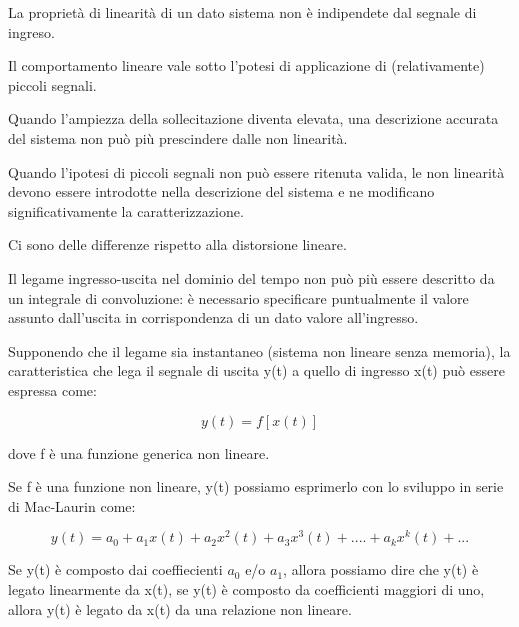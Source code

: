 La proprietà di linearità di un dato sistema non è indipendete dal segnale di ingreso. \newline 

Il comportamento lineare vale sotto l'potesi di applicazione di (relativamente) piccoli segnali. \newline 

Quando l'ampiezza della sollecitazione diventa elevata, 
una descrizione accurata del sistema non può più prescindere dalle non linearità. \newline 

Quando l'ipotesi di piccoli segnali non può essere ritenuta valida, le non linearità devono 
essere introdotte nella descrizione del sistema e ne modificano significativamente la caratterizzazione. \newline 

Ci sono delle differenze rispetto alla distorsione lineare. \newline 

Il legame ingresso-uscita nel dominio del tempo non può più essere descritto da un integrale di convoluzione: 
è necessario specificare puntualmente il valore assunto dall'uscita in corrispondenza di un dato valore all'ingresso. \newline 

Supponendo che il legame sia instantaneo (sistema non lineare senza memoria), 
la caratteristica che lega il segnale di uscita y(t) a quello di ingresso x(t) può essere espressa come: 

{
    \Large 
    \begin{equation}
        y(t) = f[x(t)]
    \end{equation}
} 

dove f è una funzione generica non lineare. \newline 

Se f è una funzione non lineare, y(t) possiamo esprimerlo con lo sviluppo in serie di Mac-Laurin come: 

{
    \Large 
    \begin{equation}
        y(t) 
        =
        a_0 + a_1 x(t) + a_2 x^{2} (t) + a_3 x^{3} (t) + .... + a_k x^{k} (t) + ...
    \end{equation}
}

Se y(t) è composto dai coeffiecienti $a_0$ e/o $a_1$, allora possiamo dire che y(t) è legato 
linearmente da x(t), se y(t) è composto da coefficienti maggiori di uno, allora y(t) è legato 
da x(t) da una relazione non lineare. \newline 

